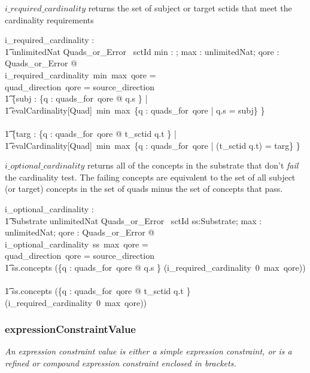 \documentclass{article}
\def\desc#1{{\small \textsl{{#1}} }}
\begin{document}
$i\_required\_cardinality$ returns the set of subject or target sctids that meet the cardinality requirements
\begin{gendef}
   i\_required\_cardinality : \\
\t1 \nat \fun unlimitedNat \fun Quads\_or\_Error \ \fun \power sctId
\where
   \forall min : \nat; max : unlimitedNat; qore : Quads\_or\_Error  @ \\
i\_required\_cardinality~min~max~qore = \\
\IF quad\_direction~qore = source\_direction \THEN \\
\t1 \{subj :  \{q : quads\_for~qore @ q.s \} | \\
\t1 evalCardinality[Quad]~min~max~\{q : quads\_for~qore | q.s = subj\} \neq \emptyset \} \\
\ELSE \\
\t1 \{targ :  \{q : quads\_for~qore @ t\_sctid \inv q.t \} | \\
\t1 evalCardinality[Quad]~min~max~\{q : quads\_for~qore | (t\_sctid \inv q.t) = targ\} \neq \emptyset \}
\end{gendef}

$i\_optional\_cardinality$ returns all of the concepts in the substrate that don't \emph{fail} the cardinality test.  The failing concepts
are equivalent to the set of all subject (or target) concepts in the set of quads minus the set of concepts that pass.

\begin{gendef}
   i\_optional\_cardinality : \\
\t1 Substrate \fun unlimitedNat \fun Quads\_or\_Error \ \fun \power sctId
\where
   \forall ss:Substrate; max : unlimitedNat; qore : Quads\_or\_Error  @ \\
i\_optional\_cardinality~ss~max~qore = \\
\IF quad\_direction~qore = source\_direction \THEN \\
\t1 ss.concepts \setminus (\{q : quads\_for~qore @ q.s \} \setminus (i\_required\_cardinality~0~max~qore)) \\
\ELSE \\
\t1 ss.concepts \setminus (\{q : quads\_for~qore @ t\_sctid \inv q.t \} \setminus (i\_required\_cardinality~0~max~qore)) 
\end{gendef}



\subsubsection{expressionConstraintValue}
\begin{framed}
\desc{An expression constraint value is either a simple expression constraint, or is a refined or compound expression constraint enclosed in brackets.}
\end{framed}
\end{document}
